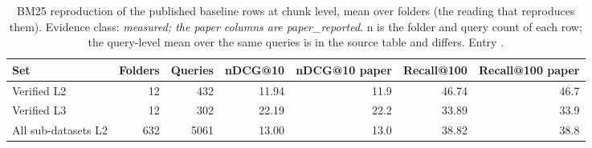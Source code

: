 \begin{table}[t]
\centering\small
\caption{BM25 reproduction of the published baseline rows at chunk level, mean over folders (the reading that reproduces them). Evidence class: \emph{measured; the paper columns are paper\_reported}. n is the folder and query count of each row; the query-level mean over the same queries is in the source table and differs. Entry .}
\label{tab:bm25_repro}
\begin{tabular}{lrrrrrr}
\toprule
Set & Folders & Queries & nDCG@10 & nDCG@10 paper & Recall@100 & Recall@100 paper \\
\midrule
Verified L2 & 12 & 432 & 11.94 & 11.9 & 46.74 & 46.7 \\
Verified L3 & 12 & 302 & 22.19 & 22.2 & 33.89 & 33.9 \\
All sub-datasets L2 & 632 & 5061 & 13.00 & 13.0 & 38.82 & 38.8 \\
\bottomrule
\end{tabular}
\end{table}
